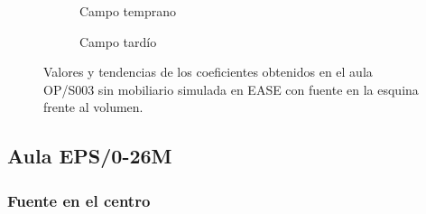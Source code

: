 \begin{figure}[H]
    \begin{subfigure}[b]{0.4\textwidth}
    	\centering%
         {%
    }
    \caption{Campo temprano}%
    \end{subfigure}%
    \hspace{1.65cm}%
    \begin{subfigure}[b]{0.4\textwidth}%
    	\centering%
        {%
    }
    \caption{Campo tardío}%
    \end{subfigure}
    \caption{Valores y tendencias de los coeficientes obtenidos en el aula OP/S003 sin mobiliario simulada en EASE con fuente en la esquina frente al volumen.}
\label{graf:coefopearlylateesquina}%
\end{figure}

\subsection{Aula EPS/0-26M}

\subsubsection{Fuente en el centro}

